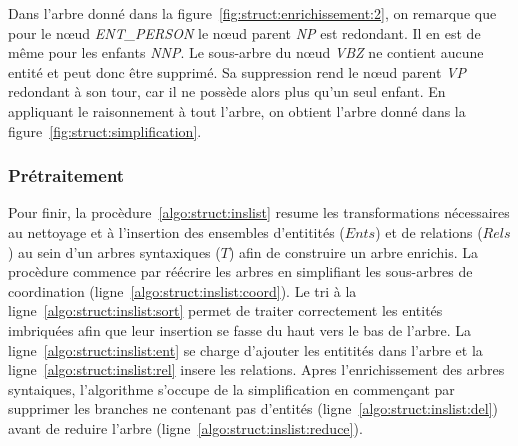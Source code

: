 \begin{example}
    Dans l'arbre donné dans la figure~\ref{fig:struct:enrichissement:2}, on remarque que pour le nœud \emph{ENT\_PERSON} le nœud parent \emph{NP} est redondant.
    Il en est de même pour les enfants \emph{NNP}.
    Le sous-arbre du nœud \emph{VBZ} ne contient aucune entité et peut donc être supprimé.
    Sa suppression rend le nœud parent \emph{VP} redondant à son tour, car il ne possède alors plus qu'un seul enfant.
    En appliquant le raisonnement à tout l'arbre, on obtient l'arbre donné dans la figure~\ref{fig:struct:simplification}.
\end{example}

\subsubsection{Prétraitement}
Pour finir, la procèdure~\ref{algo:struct:inslist} resume les transformations nécessaires au nettoyage et à l'insertion des ensembles d'entitités ($Ents$) et de relations ($Rels$) au sein d'un arbres syntaxiques ($T$) afin de construire un arbre enrichis.
La procèdure commence par réécrire les arbres en simplifiant les sous-arbres de coordination (ligne~\ref{algo:struct:inslist:coord}).
Le tri à la ligne~\ref{algo:struct:inslist:sort} permet de traiter correctement les entités imbriquées afin que leur insertion se fasse du haut vers le bas de l'arbre.
La ligne~\ref{algo:struct:inslist:ent} se charge d'ajouter les entitités dans l'arbre et la ligne~\ref{algo:struct:inslist:rel} insere les relations.
Apres l'enrichissement des arbres syntaiques, l'algorithme s'occupe de la simplification en commençant par supprimer les branches ne contenant pas d'entités (ligne~\ref{algo:struct:inslist:del}) avant de reduire l'arbre (ligne~\ref{algo:struct:inslist:reduce}).

